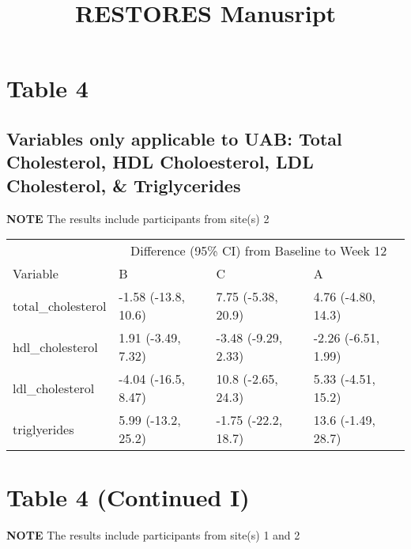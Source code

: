 \documentclass[]{article}
\title{RESTORES Manusript}
\author{}
\date{}
\begin{document}
\maketitle

\hypertarget{table-4}{%
\section{Table 4}\label{table-4}}

\hypertarget{variables-only-applicable-to-uab-total-cholesterol-hdl-choloesterol-ldl-cholesterol-triglycerides}{%
\subsection{Variables only applicable to UAB: Total Cholesterol, HDL
Choloesterol, LDL Cholesterol, \&
Triglycerides}\label{variables-only-applicable-to-uab-total-cholesterol-hdl-choloesterol-ldl-cholesterol-triglycerides}}

\textbf{NOTE} The results include participants from site(s) 2

\begin{table}[H]
\centering
\begin{tabular}{l|l|l|l}
\hline
\multicolumn{1}{c|}{ } & \multicolumn{3}{c}{Difference (95\% CI) from Baseline to Week 12} \\
\cline{2-4}
Variable & B & C & A\\
\hline
total\_cholesterol & -1.58 (-13.8, 10.6) & 7.75 (-5.38, 20.9) & 4.76 (-4.80, 14.3)\\
\hline
hdl\_cholesterol & 1.91 (-3.49, 7.32) & -3.48 (-9.29, 2.33) & -2.26 (-6.51, 1.99)\\
\hline
ldl\_cholesterol & -4.04 (-16.5, 8.47) & 10.8 (-2.65, 24.3) & 5.33 (-4.51, 15.2)\\
\hline
triglyerides & 5.99 (-13.2, 25.2) & -1.75 (-22.2, 18.7) & 13.6 (-1.49, 28.7)\\
\hline
\end{tabular}
\end{table}

\hypertarget{table-4-continued-i}{%
\section{Table 4 (Continued I)}\label{table-4-continued-i}}

\textbf{NOTE} The results include participants from site(s) 1 and 2
\end{document}

